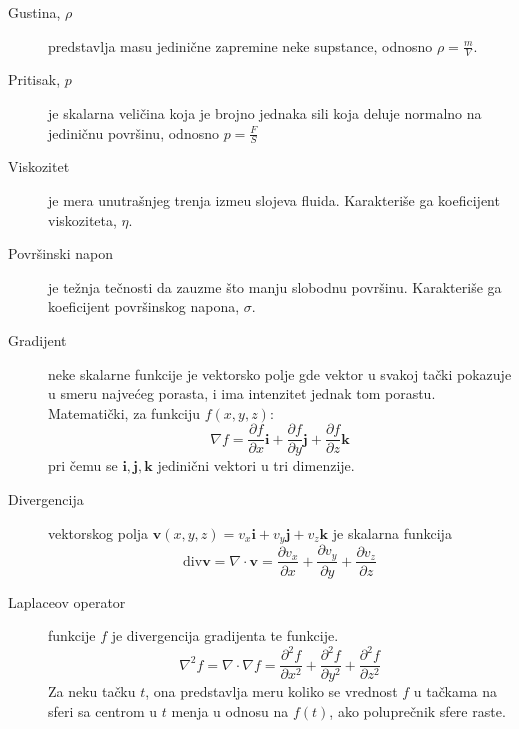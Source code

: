 \documentclass[12pt]{article}
\renewcommand{\vec}[1]{\mathbf{#1}}
\begin{document}
        \begin{description}
          \item[Gustina, $\rho$] predstavlja masu jedini\v cne zapremine neke supstance, odnosno $\rho = \frac{m}{V}$.
          \item[Pritisak, $p$] je skalarna veli\v cina koja je brojno jednaka sili koja deluje normalno na jedini\v cnu povr\v sinu, odnosno $p = \frac{F}{S}$
          \item[Viskozitet] je mera unutra\v snjeg trenja izme\dj u slojeva fluida. Karakteri\v se ga koeficijent viskoziteta, $\eta$.
          \item[Povr\v sinski napon] je te\v znja te\v cnosti da zauzme \v sto manju slobodnu povr\v sinu. Karakteri\v se ga koeficijent povr\v sinskog napona, $\sigma$.
          \item[Gradijent] neke skalarne funkcije je vektorsko polje gde vektor u svakoj ta\v cki pokazuje u smeru najve\'ceg porasta, i ima intenzitet jednak tom porastu. Matemati\v cki, za funkciju $f(x, y, z)$:
                \begin{equation}\label{eq:definicija gradijenta}
                \nabla f=\frac{\partial f}{\partial x}\vec{i} + \frac{\partial f}{\partial y}\vec{j} + \frac{\partial f}{\partial z}\vec{k}
                \end{equation}
                pri \v cemu se $\vec{i}, \vec{j}, \vec{k}$ jedini\v cni vektori u tri dimenzije.
          \item[Divergencija] vektorskog polja $\vec{v}(x, y, z)=v_x\vec{i}+v_y\vec{j}+v_z\vec{k}$ je skalarna funkcija
                \begin{equation}\label{eq:definicija divergencije}
                \text{div} \vec{v} = \nabla \cdot \vec{v} = \frac{\partial v_x}{\partial x} + \frac{\partial v_y}{\partial y} + \frac{\partial v_z}{\partial z}
                \end{equation}
          \item[Laplaceov operator] funkcije $f$ je divergencija gradijenta te funkcije. 
          \begin{equation}\label{eq:definicija laplaceovog operatora}
          \nabla^2 f = \nabla\cdot\nabla f = \frac{\partial^2 f}{\partial x^2} + \frac{\partial^2 f}{\partial y^2} + \frac{\partial^2 f}{\partial z^2}
          \end{equation}
              Za neku ta\v cku $t$, ona predstavlja meru koliko se vrednost $f$ u ta\v ckama na sferi sa centrom u $t$ menja u odnosu na $f(t)$, ako polupre\v cnik sfere raste.
        \end{description}
\end{document}
